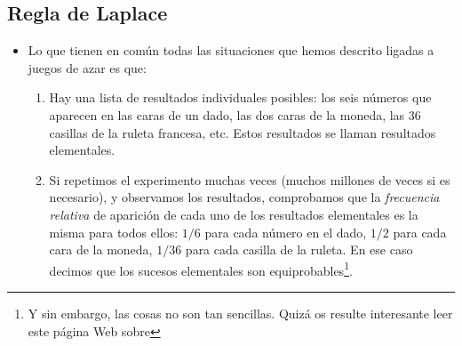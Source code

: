 \subsection{Regla de Laplace}

\begin{itemize}

    \item Lo que tienen en común todas las situaciones que hemos descrito ligadas a juegos de azar es que:
        \begin{enumerate}
            \item Hay una lista de resultados individuales posibles: los seis números que aparecen en las caras de un dado, las dos caras de la moneda, las 36 casillas de la ruleta francesa, etc. Estos resultados se llaman {\sf resultados elementales}.
            \item Si repetimos el experimento muchas veces (muchos millones de veces si es necesario), y observamos los resultados, comprobamos que la {\em frecuencia relativa} de aparición de cada uno de los resultados elementales es la misma para todos ellos: $1/6$ para cada número en el dado, $1/2$ para cada cara de la moneda, $1/36$ para cada casilla de la ruleta. En ese caso decimos que los sucesos elementales son {\sf equiprobables}\footnote{Y sin embargo, las cosas no son tan sencillas. Quizá os resulte interesante leer este página Web sobre }.
        \end{enumerate}


\end{itemize}
